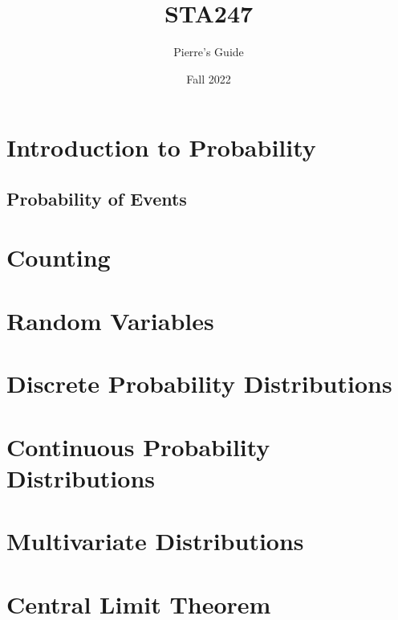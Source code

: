 \documentclass{report}
\title{\Huge{STA247}}
\author{Pierre's Guide}
\date{\huge{Fall 2022}}
\begin{document}
    \maketitle
    \newpage
    \tableofcontents
    \pagebreak

    \chapter{Introduction to Probability}




    \section{Probability of Events}





    \chapter{Counting}





    \chapter{Random Variables}





    \chapter{Discrete Probability Distributions}





    \chapter{Continuous Probability Distributions}





    \chapter{Multivariate Distributions}





    \chapter{Central Limit Theorem}



    
\end{document}

